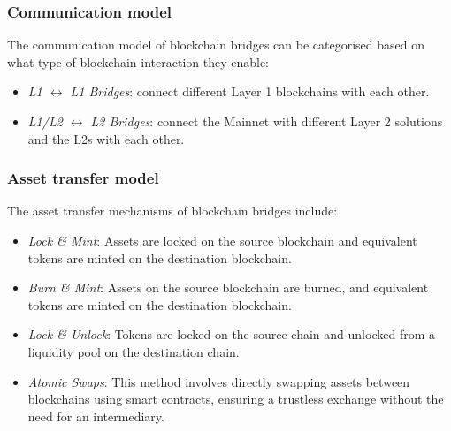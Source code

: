 \subsubsection{Communication model}
\label{subsubsec:communication_model}

The communication model of blockchain bridges can be categorised based on what type of blockchain interaction they enable:  \cite{lifi-bridge}
\begin{itemize}
    \item \textit{L1 $\leftrightarrow$ L1 Bridges}: connect different Layer 1 blockchains with each other.
    \item \textit{L1/L2 $\leftrightarrow$ L2 Bridges}: connect the Mainnet with different Layer 2 solutions and the L2s with each other. 
\end{itemize}

\subsubsection{Asset transfer model}
\label{subsubsec:asset_transfer_model}

The asset transfer mechanisms of blockchain bridges include:  \cite{lifi-bridge}  \cite{chainlink-transfer-assets}
\begin{itemize}
    \item \textit{Lock \& Mint}: Assets are locked on the source blockchain and equivalent tokens are minted on the destination blockchain. 
    \item \textit{Burn \& Mint}: Assets on the source blockchain are burned, and equivalent tokens are minted on the destination blockchain.  
    \item \textit{Lock \& Unlock}: Tokens are locked on the source chain and unlocked from a liquidity pool on the destination chain. 
    \item \textit{Atomic Swaps}: This method involves directly swapping assets between blockchains using smart contracts, ensuring a trustless exchange without the need for an intermediary. 
\end{itemize}



